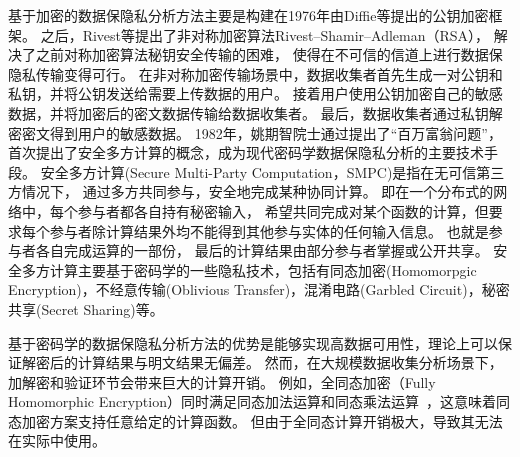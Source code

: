 基于加密的数据保隐私分析方法主要是构建在1976年由Diffie等提出的公钥加密框架\cite{DBLP:journals/tit/DiffieH76}。
之后，Rivest等提出了非对称加密算法Rivest–Shamir–Adleman（RSA），
解决了之前对称加密算法秘钥安全传输的困难\cite{DBLP:journals/cacm/RivestSA78}，
使得在不可信的信道上进行数据保隐私传输变得可行。
在非对称加密传输场景中，数据收集者首先生成一对公钥和私钥，并将公钥发送给需要上传数据的用户。
接着用户使用公钥加密自己的敏感数据，并将加密后的密文数据传输给数据收集者。
最后，数据收集者通过私钥解密密文得到用户的敏感数据。
1982年，姚期智院士通过提出了“百万富翁问题”，首次提出了安全多方计算的概念\cite{DBLP:conf/focs/Yao82b}，成为现代密码学数据保隐私分析的主要技术手段。
安全多方计算(Secure Multi-Party Computation，SMPC)是指在无可信第三方情况下，
通过多方共同参与，安全地完成某种协同计算。
即在一个分布式的网络中，每个参与者都各自持有秘密输入，
希望共同完成对某个函数的计算，但要求每个参与者除计算结果外均不能得到其他参与实体的任何输入信息。
也就是参与者各自完成运算的一部份，
最后的计算结果由部分参与者掌握或公开共享。
安全多方计算主要基于密码学的一些隐私技术，包括有同态加密(Homomorpgic Encryption)\cite{rivest1978data}，不经意传输(Oblivious Transfer)\cite{DBLP:journals/iacr/Rabin05}，混淆电路(Garbled Circuit)\cite{DBLP:conf/focs/Yao86}，秘密共享(Secret Sharing)\cite{DBLP:journals/cacm/Shamir79, DBLP:conf/mark2/Blakley79}等。

基于密码学的数据保隐私分析方法的优势是能够实现高数据可用性，理论上可以保证解密后的计算结果与明文结果无偏差。
然而，在大规模数据收集分析场景下，加解密和验证环节会带来巨大的计算开销。
例如，全同态加密（Fully Homomorphic Encryption）同时满足同态加法运算和同态乘法运算~\cite{DBLP:conf/stoc/Gentry09}，这意味着同态加密方案支持任意给定的计算函数。
但由于全同态计算开销极大，导致其无法在实际中使用。


